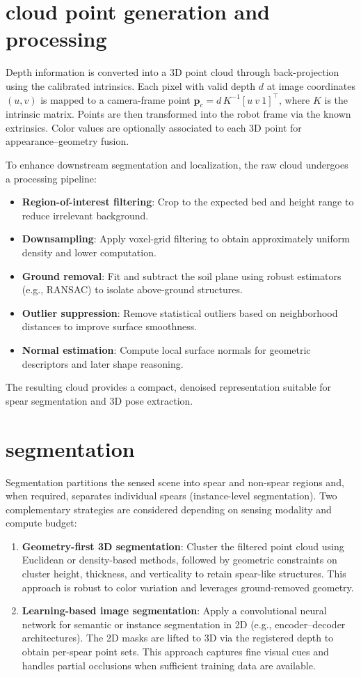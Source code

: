\section{cloud point generation and processing}
Depth information is converted into a 3D point cloud through back-projection using the calibrated intrinsics. Each pixel with valid depth \(d\) at image coordinates \((u, v)\) is mapped to a camera-frame point \(\mathbf{p}_c = d\,K^{-1}[u\ v\ 1]^\top\), where \(K\) is the intrinsic matrix. Points are then transformed into the robot frame via the known extrinsics. Color values are optionally associated to each 3D point for appearance--geometry fusion.

To enhance downstream segmentation and localization, the raw cloud undergoes a processing pipeline:
\begin{itemize}
  \item \textbf{Region-of-interest filtering}: Crop to the expected bed and height range to reduce irrelevant background.
  \item \textbf{Downsampling}: Apply voxel-grid filtering to obtain approximately uniform density and lower computation.
  \item \textbf{Ground removal}: Fit and subtract the soil plane using robust estimators (e.g., RANSAC) to isolate above-ground structures.
  \item \textbf{Outlier suppression}: Remove statistical outliers based on neighborhood distances to improve surface smoothness.
  \item \textbf{Normal estimation}: Compute local surface normals for geometric descriptors and later shape reasoning.
\end{itemize}
The resulting cloud provides a compact, denoised representation suitable for spear segmentation and 3D pose extraction.

\section{segmentation}
Segmentation partitions the sensed scene into spear and non-spear regions and, when required, separates individual spears (instance-level segmentation). Two complementary strategies are considered depending on sensing modality and compute budget:
\begin{enumerate}
  \item \textbf{Geometry-first 3D segmentation}: Cluster the filtered point cloud using Euclidean or density-based methods, followed by geometric constraints on cluster height, thickness, and verticality to retain spear-like structures. This approach is robust to color variation and leverages ground-removed geometry.
  \item \textbf{Learning-based image segmentation}: Apply a convolutional neural network for semantic or instance segmentation in 2D (e.g., encoder--decoder architectures). The 2D masks are lifted to 3D via the registered depth to obtain per-spear point sets. This approach captures fine visual cues and handles partial occlusions when sufficient training data are available.
\end{enumerate}

